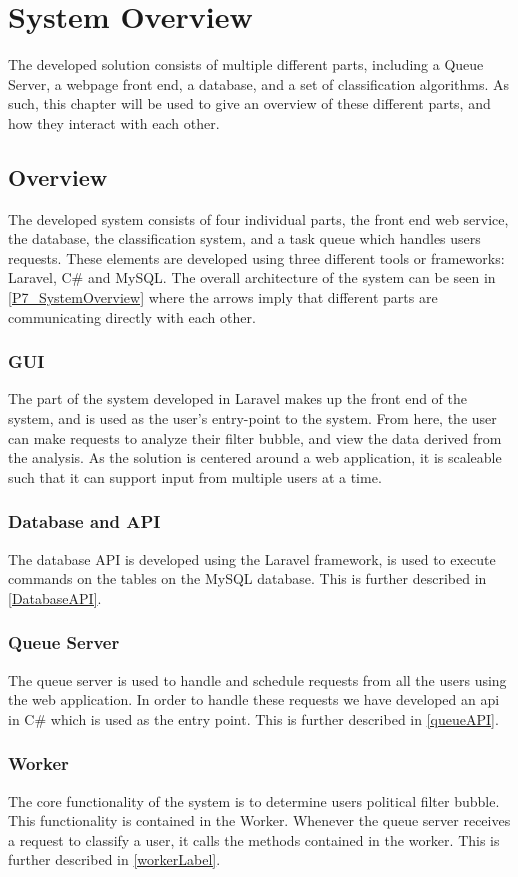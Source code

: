 \chapter{System Overview}  The developed solution consists of multiple different parts, including a Queue
Server, a webpage front end, a database, and a set of classification algorithms.
As such, this chapter will be used to give an overview of these different parts,
and how they interact with each other.

\section{Overview}
The developed system consists of four individual parts, the front end web
service, the database, the classification system, and a task queue which handles
users requests. These elements are developed using three different tools or
frameworks: Laravel, C\# and MySQL. The overall architecture of the system can
be seen in \autoref{P7_SystemOverview} where the arrows imply that different parts
are communicating directly with each other.
 

\subsection{GUI} %
The part of the system developed in Laravel makes up the front end of the
system, and is used as the user's entry-point to the system. From here, the user can
make requests to analyze their filter bubble, and view the data derived from
the analysis. As the solution is centered around a web application, it is
scaleable such that it can support input from multiple users at a time.\nl

\subsection{Database and API}
The database API is developed using the Laravel framework, is used to execute
commands on the tables on the MySQL database. This is further described in
\autoref{DatabaseAPI}.

\subsection{Queue Server}
The queue server is used to handle and schedule requests from all the users
using the web application. In order to handle these requests we have developed
an api in C\# which is used as the entry point. This is further described in
\autoref{queueAPI}. 

\subsection{Worker}
The core functionality of the system is to determine users political filter
bubble. This functionality is contained in the Worker. Whenever the queue server
receives a request to classify a user, it calls the methods contained in the
worker. This is further described in \autoref{workerLabel}.
